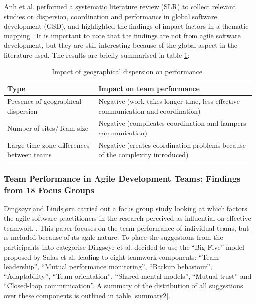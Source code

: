 Anh et al. performed a systematic literature review (SLR) to collect relevant studies on dispersion, coordination and performance in global software development (GSD), and highlighted the findings of impact factors in a thematic mapping \cite{Anh2012}. It is important to note that the findings are not from agile software development, but they are still interesting because of the global aspect in the literature used. The results are briefly summarised in table \ref{GSD}:

\begin{table}
\begin{center}
    \begin{tabular}{ | p{5cm} | p{8cm} |}
    \hline
    \textbf{Type} & \textbf{Impact on team performance} \\ \hline
    Presence of geographical dispersion & Negative (work takes longer time, less effective communication and coordination) \\ \hline
    Number of sites/Team size & Negative (complicates coordination and hampers communication) \\ \hline
    Large time zone differences between teams & Negative (creates coordination problems because of the complexity introduced) \\ \hline
    \end{tabular}
    \caption{Impact of geographical dispersion on performance.}
    \label{GSD}
\end{center}
\end{table}

\subsubsection{Team Performance in Agile Development Teams: Findings from 18 Focus Groups}

Dingsøyr and Lindsjørn carried out a focus group study looking at which factors the agile software practitioners in the research perceived as influential on effective teamwork \cite{Dingsoyr2013c}. This paper focuses on the team performance of individual teams, but is included because of its agile nature. To place the suggestions from the participants into categorise Dingsøyr et al. decided to use the ``Big Five'' model proposed by Salas et al. \cite{Salas2005} leading to eight teamwork components: ``Team leadership'', ``Mutual performance monitoring'', ``Backup behaviour'', ``Adaptability'', ``Team orientation'', ``Shared mental models'', ``Mutual trust'' and ``Closed-loop communication''. A summary of the distribution of all suggestions over these components is outlined in table \ref{summary2}.

